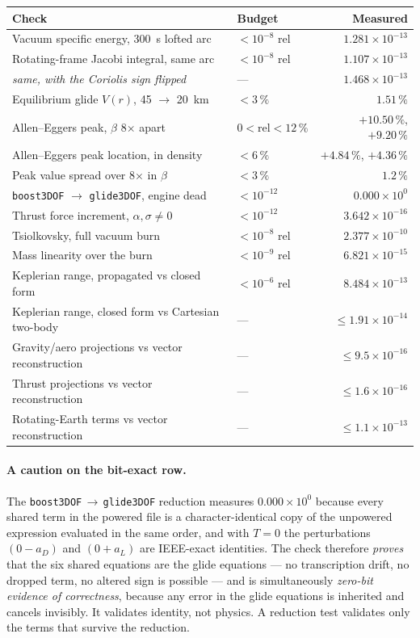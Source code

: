 \documentclass[11pt]{article}
\newcommand{\code}[1]{\texttt{#1}}
\begin{document}
\begin{center}\small
\begin{tabular}{@{}llr@{}}
\toprule
Check & Budget & Measured \\
\midrule
Vacuum specific energy, 300~s lofted arc          & $<10^{-8}$ rel & $1.281\times10^{-13}$ \\
Rotating-frame Jacobi integral, same arc          & $<10^{-8}$ rel & $1.107\times10^{-13}$ \\
\quad \emph{same, with the Coriolis sign flipped} & --- & $1.468\times10^{-13}$ \\
Equilibrium glide $V(r)$, 45 $\to$ 20~km          & $<3\,\%$ & $1.51\,\%$ \\
Allen--Eggers peak, $\beta$ 8$\times$ apart       & $0<\text{rel}<12\,\%$ & $+10.50\,\%$, $+9.20\,\%$ \\
Allen--Eggers peak location, in density           & $<6\,\%$ & $+4.84\,\%$, $+4.36\,\%$ \\
Peak value spread over 8$\times$ in $\beta$       & $<3\,\%$ & $1.2\,\%$ \\
\code{boost3DOF} $\to$ \code{glide3DOF}, engine dead & $<10^{-12}$ & $0.000\times10^{0}$ \\
Thrust force increment, $\alpha,\sigma\ne 0$      & $<10^{-12}$ & $3.642\times10^{-16}$ \\
Tsiolkovsky, full vacuum burn                     & $<10^{-8}$ rel & $2.377\times10^{-10}$ \\
Mass linearity over the burn                      & $<10^{-9}$ rel & $6.821\times10^{-15}$ \\
Keplerian range, propagated vs closed form        & $<10^{-6}$ rel & $8.484\times10^{-13}$ \\
Keplerian range, closed form vs Cartesian two-body & --- & $\le1.91\times10^{-14}$ \\
Gravity/aero projections vs vector reconstruction & --- & $\le9.5\times10^{-16}$ \\
Thrust projections vs vector reconstruction       & --- & $\le1.6\times10^{-16}$ \\
Rotating-Earth terms vs vector reconstruction     & --- & $\le1.1\times10^{-13}$ \\
\bottomrule
\end{tabular}
\end{center}

\paragraph{A caution on the bit-exact row.} The
\code{boost3DOF}$\,\to\,$\code{glide3DOF} reduction measures $0.000\times10^0$
because every shared term in the powered file is a character-identical copy of
the unpowered expression evaluated in the same order, and with $T=0$ the
perturbations $(0 - a_D)$ and $(0 + a_L)$ are IEEE-exact identities. The check
therefore \emph{proves} that the six shared equations are the glide equations
--- no transcription drift, no dropped term, no altered sign is possible --- and
is simultaneously \emph{zero-bit evidence of correctness}, because any error in
the glide equations is inherited and cancels invisibly. It validates identity,
not physics. A reduction test validates only the terms that survive the
reduction.
\end{document}
